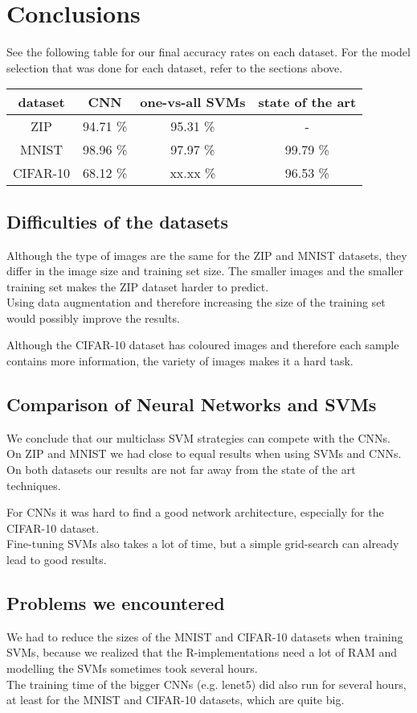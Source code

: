 
\section{Conclusions}

See the following table for our final accuracy rates on each dataset.
For the model selection that was done for each dataset, refer to the sections above.\\

\begin{tabular}{|c|c|c|c|}
 \hline
 dataset & CNN & one-vs-all SVMs & state of the art \\ \hline
 ZIP & 94.71 \% & 95.31 \% & - \\
 MNIST & 98.96 \% & 97.97 \% & 99.79 \% \\
 CIFAR-10 & 68.12 \% & xx.xx \% & 96.53 \% \\
 \hline
\end{tabular}


\subsection{Difficulties of the datasets}

Although the type of images are the same for the ZIP and MNIST datasets,
they differ in the image size and training set size.
The smaller images and the smaller training set makes the ZIP dataset harder to predict.\\
Using data augmentation and therefore increasing the size of the training set would possibly improve the results.

Although the CIFAR-10 dataset has coloured images and therefore each sample contains more information,
the variety of images makes it a hard task.


\subsection{Comparison of Neural Networks and SVMs}

We conclude that our multiclass SVM strategies can compete with the CNNs.\\
On ZIP and MNIST we had close to equal results when using SVMs and CNNs.\\
On both datasets our results are not far away from the state of the art techniques.

For CNNs it was hard to find a good network architecture, especially for the CIFAR-10 dataset.\\
Fine-tuning SVMs also takes a lot of time, but a simple grid-search can already lead to good results.

\subsection{Problems we encountered}

We had to reduce the sizes of the MNIST and CIFAR-10 datasets when training SVMs,
because we realized that the R-implementations need a lot of RAM
and modelling the SVMs sometimes took several hours.\\

The training time of the bigger CNNs (e.g. lenet5) did also run for several hours,
at least for the MNIST and CIFAR-10 datasets, which are quite big.